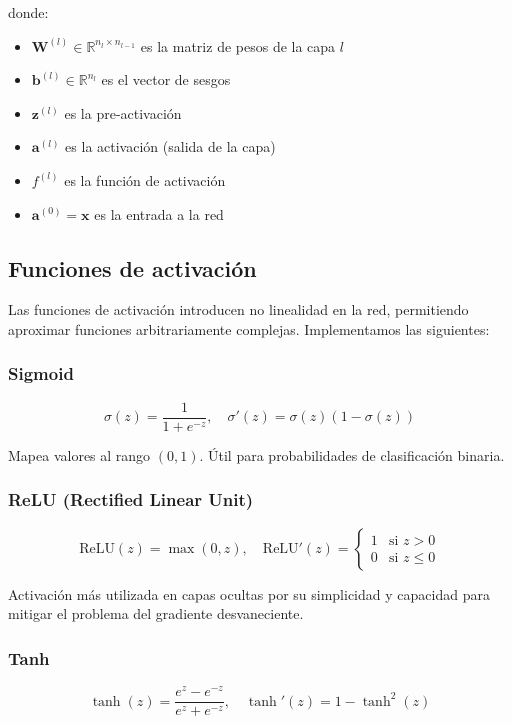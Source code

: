 \documentclass[a4paper,11pt]{article}
\begin{document}
donde:
\begin{itemize}
    \item $\mathbf{W}^{(l)} \in \mathbb{R}^{n_l \times n_{l-1}}$ es la matriz de pesos de la capa $l$
    \item $\mathbf{b}^{(l)} \in \mathbb{R}^{n_l}$ es el vector de sesgos
    \item $\mathbf{z}^{(l)}$ es la pre-activación
    \item $\mathbf{a}^{(l)}$ es la activación (salida de la capa)
    \item $f^{(l)}$ es la función de activación
    \item $\mathbf{a}^{(0)} = \mathbf{x}$ es la entrada a la red
\end{itemize}

\subsection{Funciones de activación}

Las funciones de activación introducen no linealidad en la red, permitiendo aproximar funciones arbitrariamente complejas. Implementamos las siguientes:

\subsubsection{Sigmoid}
\begin{equation}
\sigma(z) = \frac{1}{1 + e^{-z}}, \quad \sigma'(z) = \sigma(z)(1 - \sigma(z))
\end{equation}

Mapea valores al rango $(0, 1)$. Útil para probabilidades de clasificación binaria.

\subsubsection{ReLU (Rectified Linear Unit)}
\begin{equation}
\text{ReLU}(z) = \max(0, z), \quad \text{ReLU}'(z) = \begin{cases} 1 & \text{si } z > 0 \\ 0 & \text{si } z \leq 0 \end{cases}
\end{equation}

Activación más utilizada en capas ocultas por su simplicidad y capacidad para mitigar el problema del gradiente desvaneciente.

\subsubsection{Tanh}
\begin{equation}
\tanh(z) = \frac{e^z - e^{-z}}{e^z + e^{-z}}, \quad \tanh'(z) = 1 - \tanh^2(z)
\end{equation}
\end{document}
